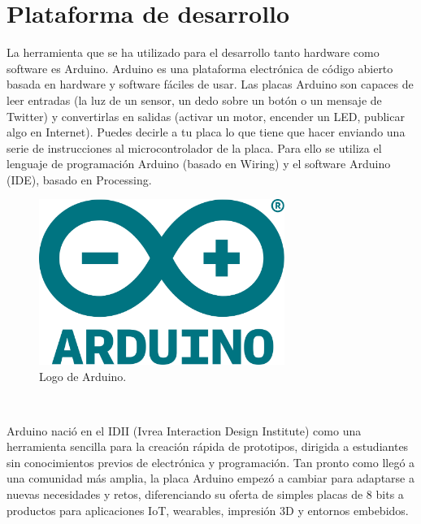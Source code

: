 \chapter{Plataforma de desarrollo}
\label{cap:capitulo3}


La herramienta que se ha utilizado para el desarrollo tanto hardware como software es Arduino. Arduino es una plataforma electrónica de código abierto basada en hardware y 
software fáciles de usar. Las placas Arduino son capaces de leer entradas (la luz de un sensor, un dedo sobre un botón o un mensaje de Twitter) y convertirlas en salidas 
(activar un motor, encender un LED, publicar algo en Internet). Puedes decirle a tu placa lo que tiene que hacer enviando una serie de instrucciones al 
microcontrolador de la placa. Para ello se utiliza el lenguaje de programación Arduino (basado en Wiring) y el software Arduino (IDE), basado en Processing.

\vspace{1cm}

\begin{figure} [h!]
    \begin{center}
      \includegraphics[width=8cm]{figs/arduino}
    \end{center}
    \caption{Logo de Arduino.}
    \label{fig:arduino}
  \end{figure}\

  Arduino nació en el  IDII (Ivrea Interaction Design Institute) como una herramienta sencilla para la creación rápida de prototipos, dirigida a estudiantes sin conocimientos previos 
  de electrónica y programación. Tan pronto como llegó a una comunidad más amplia, la placa Arduino empezó a cambiar para adaptarse a nuevas necesidades y retos, diferenciando 
  su oferta de simples placas de 8 bits a productos para aplicaciones IoT, wearables, impresión 3D y entornos embebidos.

  